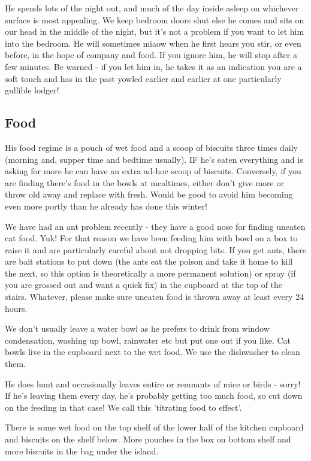 \documentclass[11pt]{article}
\begin{document}
He spends lots of the night out, and much of the day inside asleep on whichever surface is most appealing. We keep bedroom doors shut else he comes and sits on our head in the middle of the night, but it's not a problem if you want to let him into the bedroom.  He will sometimes miaow when he first hears you stir, or even before, in the hope of company and food.  If you ignore him, he will stop after a few minutes.  Be warned - if you let him in, he takes it as an indication you are a soft touch and has in the past yowled earlier and earlier at one particularly gullible lodger!
\subsection*{Food}
His food regime is a pouch of wet food and a scoop of biscuits three times daily (morning and, supper time and bedtime usually). IF he's eaten everything and is asking for more he can have an extra ad-hoc scoop of biscuits.  Conversely, if you are finding there's food in the bowls at mealtimes, either don't give more or throw old away and replace with fresh.  Would be good to avoid him becoming even more portly than he already has done this winter! 

We have had an ant problem recently - they have a good nose for finding uneaten cat food.  Yuk!  For that reason we have been feeding him with bowl on a box to raise it and are particularly careful about not dropping bits.  If you get ants, there are bait stations to put down (the ants eat the poison and take it home to kill the next, so this option is theoretically a more permanent solution) or spray (if you are grossed out and want a quick fix) in the cupboard at the top of the stairs.  Whatever, please make sure uneaten food is thrown away at least every 24 hours.  

We don't usually leave a water bowl as he prefers to drink from window condensation, washing up bowl, rainwater etc but put one out if you like.  Cat bowls live in the cupboard next to the wet food.  We use the dishwasher to clean them.    

He does hunt and occasionally leaves entire or remnants of mice or birds - sorry! If he's leaving them every day, he's probably getting too much food, so cut down on the feeding in that case! We call this 'titrating food to effect'. 

There is some wet food on the top shelf of the lower half of the kitchen cupboard and biscuits on the shelf below. More pouches in the box on bottom shelf and more biscuits in the bag under the island.
\end{document}
